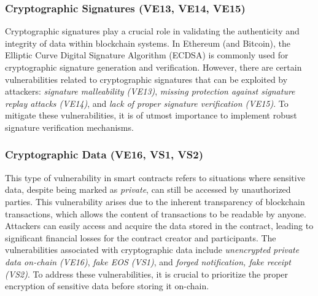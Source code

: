 \documentclass[manuscript,screen]{acmart}
\begin{document}
\subsubsection{Cryptographic Signatures (VE13, VE14, VE15)}
Cryptographic signatures play a crucial role in validating the authenticity and integrity of data within blockchain systems. In Ethereum (and Bitcoin), the Elliptic Curve Digital Signature Algorithm (ECDSA) is commonly used for cryptographic signature generation and verification. However, there are certain vulnerabilities related to cryptographic signatures that can be exploited by attackers: \textit{signature malleability (VE13)}, \textit{missing protection against signature replay attacks (VE14)}, and \textit{lack of proper signature verification (VE15)}. To mitigate these vulnerabilities, it is of utmost importance to implement robust signature verification mechanisms. 


\subsubsection{Cryptographic Data (VE16, VS1, VS2)}
This type of vulnerability in smart contracts refers to situations where sensitive data, despite being marked as \textit{private}, can still be accessed by unauthorized parties. This vulnerability arises due to the inherent transparency of blockchain transactions, which allows the content of transactions to be readable by anyone.  Attackers can easily access and acquire the data stored in the contract, leading to significant financial losses for the contract creator and participants. The vulnerabilities associated with cryptographic data include \textit{unencrypted private data on-chain (VE16)}, \textit{fake EOS (VS1)}, and \textit{forged notification, fake receipt (VS2)}. To address these vulnerabilities, it is crucial to prioritize the proper encryption of sensitive data before storing it on-chain. 
\end{document}
